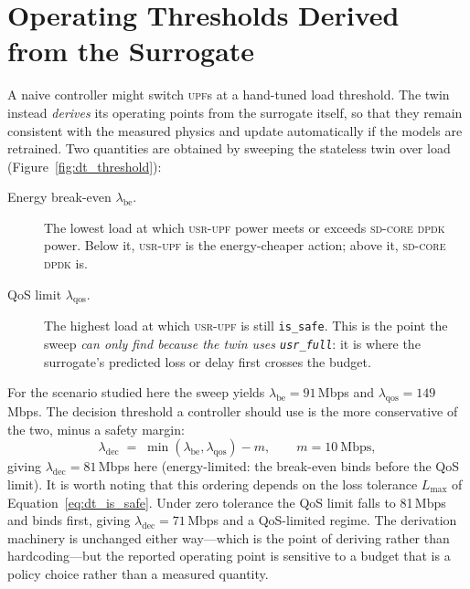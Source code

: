 \documentclass[12pt, a4paper]{report}
\newcommand{\dpdk}{\textsc{sd-core dpdk}}
\newcommand{\usr}{\textsc{usr-upf}}
\newcommand{\upf}{\textsc{upf}}
\newcommand{\code}[1]{\texttt{#1}}
\begin{document}
\section{Operating Thresholds Derived from the Surrogate}
\label{sec:dt_thresholds}

A naive controller might switch \upf{}s at a hand-tuned load threshold. The
twin instead \emph{derives} its operating points from the surrogate itself, so
that they remain consistent with the measured physics and update automatically
if the models are retrained. Two quantities are obtained by sweeping the
stateless twin over load (Figure~\ref{fig:dt_threshold}):

\begin{description}
  \item[Energy break-even $\lambda_{\mathrm{be}}$.] The lowest load at which
    \usr{} power meets or exceeds \dpdk{} power. Below it, \usr{} is the
    energy-cheaper action; above it, \dpdk{} is.
  \item[QoS limit $\lambda_{\mathrm{qos}}$.] The highest load at which \usr{}
    is still \code{is\_safe}. This is the point the sweep \emph{can only find
    because the twin uses \code{usr\_full}}: it is where the surrogate's
    predicted loss or delay first crosses the budget.
\end{description}

\noindent
For the scenario studied here the sweep yields
$\lambda_{\mathrm{be}} = 91$\,Mbps and $\lambda_{\mathrm{qos}} = 149$\,Mbps. The
decision threshold a controller should use is the more conservative of the
two, minus a safety margin:
\begin{equation}
  \lambda_{\mathrm{dec}} \;=\;
  \min(\lambda_{\mathrm{be}}, \lambda_{\mathrm{qos}}) - m,
  \qquad m = 10~\text{Mbps},
  \label{eq:dt_decision}
\end{equation}
giving $\lambda_{\mathrm{dec}} = 81$\,Mbps here (energy-limited: the
break-even binds before the QoS limit). It is worth noting that this ordering
depends on the loss tolerance $L_{\max}$ of
Equation~\eqref{eq:dt_is_safe}. Under zero tolerance the QoS limit falls to
81\,Mbps and binds first, giving $\lambda_{\mathrm{dec}} = 71$\,Mbps and a
QoS-limited regime. The derivation machinery is unchanged either way---which
is the point of deriving rather than hardcoding---but the reported operating
point is sensitive to a budget that is a policy choice rather than a measured
quantity.
\end{document}
